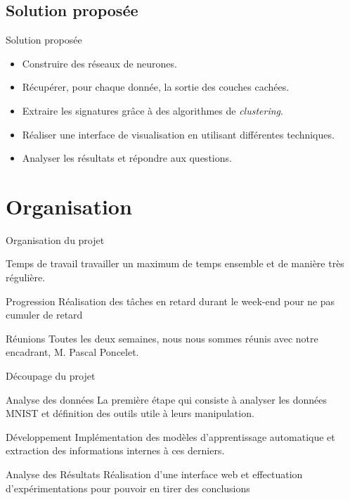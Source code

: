 \documentclass[10pt,handout]{beamer}
\newif\ifplacelogo %
\begin{document}
\subsection{Solution proposée}
\begin{frame}{Solution proposée}
    \begin{itemize}
        \item Construire des réseaux de neurones.
        \item Récupérer, pour chaque donnée, la sortie des couches cachées.
        \item Extraire les signatures grâce à des algorithmes de \textit{clustering}.
        \item Réaliser une interface de visualisation en utilisant différentes techniques.
        \item Analyser les résultats et répondre aux questions.
    \end{itemize}
\end{frame}

\section{Organisation}
\begin{frame}{Organisation du projet}

    \begin{block}{Temps de travail}
        travailler un maximum
        de temps ensemble et de manière très régulière.
    \end{block}

    \begin{block}{Progression}
        Réalisation des tâches en retard durant le
        week-end pour ne pas cumuler de retard
    \end{block}

    \begin{block}{Réunions}
        Toutes les deux semaines, nous nous sommes réunis avec notre encadrant, M. Pascal Poncelet.
    \end{block}
\end{frame}
\placelogofalse
\begin{frame}{Découpage du projet}
    \begin{block}{Analyse des données}
        La première étape qui consiste à analyser les données MNIST et définition des outils utile à leurs manipulation.
    \end{block}

    \begin{block}{Développement}
        Implémentation des modèles d'apprentissage automatique et extraction des informations internes à ces derniers.
    \end{block}

    \begin{block}{Analyse des Résultats}
        Réalisation d'une interface web et effectuation d'expérimentations pour pouvoir en tirer des conclusions
    \end{block}
\end{frame}
\placelogotrue
\end{document}
